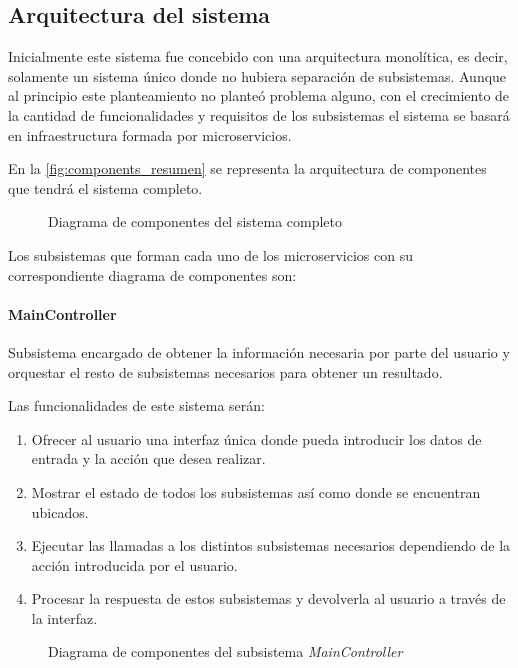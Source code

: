 \documentclass[../main.tex]{subfiles}
\begin{document}
\subsection{Arquitectura del sistema}\label{subsec:arquitectura_sistema}
Inicialmente este sistema fue concebido con una arquitectura monolítica, es decir, solamente un sistema único donde no hubiera separación de subsistemas. Aunque al principio este planteamiento no planteó problema alguno, con el crecimiento de la cantidad de funcionalidades y requisitos de los subsistemas el sistema se basará en infraestructura formada por microservicios.

En la \autoref{fig:components_resumen} se representa la arquitectura de componentes que tendrá el sistema completo.

\begin{figure}[H]
    \centering
    
    \label{fig:components_resumen}
    \caption{Diagrama de componentes del sistema completo}
\end{figure}

Los subsistemas que forman cada uno de los microservicios con su correspondiente diagrama de componentes son:
\paragraph{MainController}\label{par:maincontroller}
Subsistema encargado de obtener la información necesaria por parte del usuario y orquestar el resto de subsistemas necesarios para obtener un resultado.

Las funcionalidades de este sistema serán:
\begin{enumerate}
    \item Ofrecer al usuario una interfaz única donde pueda introducir los datos de entrada y la acción que desea realizar.
    \item Mostrar el estado de todos los subsistemas así como donde se encuentran ubicados.
    \item Ejecutar las llamadas a los distintos subsistemas necesarios dependiendo de la acción introducida por el usuario.
    \item Procesar la respuesta de estos subsistemas y devolverla al usuario a través de la interfaz.
\end{enumerate}

\begin{figure}[H]
    \centering
    
    \label{fig:components_main}
    \caption{Diagrama de componentes del subsistema \textit{MainController}}
\end{figure}
\end{document}
